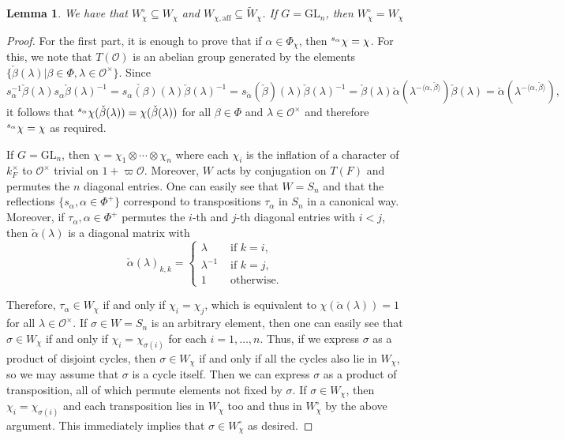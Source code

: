 \documentclass{article}
\newcommand{\aff}{\mathrm{aff}}
\newcommand{\calpha}{\check{\alpha}}
\newcommand{\cbeta}{\check{\beta}}
\newcommand{\cO}{\mathcal{O}}
\theoremstyle{plain}
\newtheorem{lemma}[theorem]{Lemma}
\theoremstyle{definition}
\begin{document}
    \begin{lemma}
        We have that $W_\chi^\circ\subseteq W_\chi$ and $W_{\chi,\aff}\subseteq \tilde{W}_\chi$. If $G=\mathrm{GL}_n$, then $W_\chi^\circ= W_\chi$
    \end{lemma}
    \begin{proof}
        For the first part, it is enough to prove that if $\alpha\in\Phi_\chi$, then $\prescript{s_\alpha}{}{\chi}=\chi$. For this, we note that $T(\cO)$ is an abelian group generated by the elements $\{\cbeta(\lambda)|\beta\in\Phi,\lambda\in\cO^\times\}$. Since 
        $$s_\alpha^{-1}\cbeta(\lambda)s_\alpha\cbeta(\lambda)^{-1}=\check{s_\alpha(\beta)}(\lambda)\check{\beta}(\lambda)^{-1}=s_{\calpha}(\cbeta)(\lambda)\cbeta(\lambda)^{-1}=\cbeta(\lambda)\calpha(\lambda^{-\langle\alpha,\cbeta\rangle})\cbeta(\lambda)=\calpha(\lambda^{-\langle\alpha,\cbeta\rangle}),$$
        it follows that $\prescript{s_\alpha}{}{\chi}(\cbeta(\lambda))=\chi(\cbeta(\lambda))$ for all $\beta\in\Phi$ and $\lambda\in\cO^\times$ and therefore $\prescript{s_\alpha}{}{\chi}=\chi$ as required.

        If $G=\mathrm{GL}_n$, then $\chi=\chi_1\otimes\cdots\otimes\chi_n$ where each $\chi_i$ is the inflation of a character of $k_F^\times$ to $\cO^\times$ trivial on $1+\varpi\cO$. Moreover, $W$ acts by conjugation on $T(F)$ and permutes the $n$ diagonal entries. One can easily see that $W=S_n$ and that the reflections $\{s_\alpha, \alpha\in\Phi^+\}$ correspond to transpositions $\tau_\alpha$ in $S_n$ in a canonical way. Moreover, if $\tau_\alpha,\alpha\in\Phi^+$ permutes the $i$-th and $j$-th diagonal entries with $i<j$, then $\calpha(\lambda)$ is a diagonal matrix with 
        $$\calpha(\lambda)_{k,k}=\begin{cases}
            \lambda &\text{ if } k=i,\\
            \lambda^{-1} &\text{ if } k=j,\\
            1 &\text{ otherwise.}
        \end{cases}$$
        
        Therefore, $\tau_\alpha\in W_\chi$ if and only if $\chi_i=\chi_j$, which is equivalent to $\chi(\calpha(\lambda))=1$ for all $\lambda\in\cO^\times$. If $\sigma\in W=S_n$ is an arbitrary element, then one can easily see that $\sigma\in W_\chi$ if and only if $\chi_i=\chi_{\sigma(i)}$ for each $i=1,\ldots,n$. Thus, if we express $\sigma$ as a product of disjoint cycles, then $\sigma\in W_\chi$ if and only if all the cycles also lie in $W_\chi$, so we may assume that $\sigma$ is a cycle itself. Then we can express $\sigma$ as a product of transposition, all of which permute elements not fixed by $\sigma$. If $\sigma\in W_\chi$, then $\chi_i=\chi_{\sigma(i)}$ and each transposition lies in $W_\chi$ too and thus in $W_\chi^\circ$ by the above argument. This immediately implies that $\sigma\in W_\chi^\circ$ as desired. 
    \end{proof}
\end{document}
